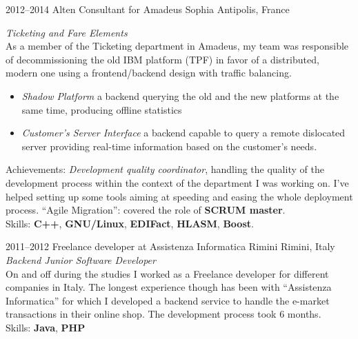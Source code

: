 \documentclass[]{friggeri-cv}
\begin{document}
\begin{entrylist}
  \entry
      {2012--2014}
      {Alten Consultant for Amadeus}
      {Sophia Antipolis, France}
      {\emph{Ticketing and Fare Elements} \\
        As a member of the Ticketing department in Amadeus, my team was
        responsible of decommissioning the old IBM platform (TPF) in favor of a
        distributed, modern one using a frontend/backend design with traffic
        balancing.
        \begin{itemize}
        \item \emph{Shadow Platform} a backend querying the old and the new
          platforms at the same time, producing offline statistics
        \item \emph{Customer's Server Interface} a backend capable to query a
          remote dislocated server providing real-time information based on the
          customer's needs.
        \end{itemize}
        Achievements: \emph{Development quality coordinator}, handling the
        quality of the development process within the context of the department
        I was working on. I've helped setting up some tools aiming at speeding
        and easing the whole deployment process. ``Agile Migration'': covered
        the role of \textbf{SCRUM master}. \\
        Skills: \textbf{C++}, \textbf{GNU/Linux}, \textbf{EDIFact}, \textbf{HLASM}, 
        \textbf{Boost}.
      }
\end{entrylist}

\begin{entrylist}
  \entry
    {2011--2012}
    {Freelance developer at Assistenza Informatica Rimini}
    {Rimini, Italy}
    {\emph{Backend Junior Software Developer} \\
      On and off during the studies I worked as a Freelance developer for
      different companies in Italy.  The longest experience though has been
      with ``Assistenza Informatica'' for which I developed a backend service
      to handle the e-market transactions in their online shop.  The development
      process took 6 months. \\
      Skills: \textbf{Java}, \textbf{PHP}
    }
\end{entrylist}
\end{document}

